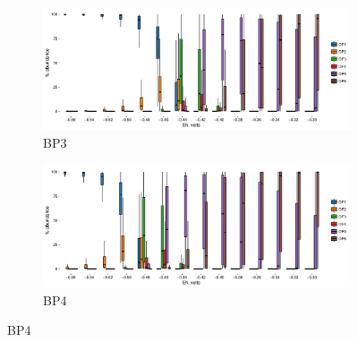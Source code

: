 {\begin{figure}[h]
    \begin{subfigure}[b]{\linewidth}
      	\includegraphics[width=1\linewidth]{"figs_ch2/boxplot_ggplot_02bin Bison OF3 iter 999"}
      	\caption{BP3}
        \label{fig:BP3_mc}
    \end{subfigure}
    \begin{subfigure}[b]{\linewidth}
    	\includegraphics[width=1\linewidth]{"figs_ch2/boxplot_ggplot_02bin Bison OF4 iter 999"}
    	\caption{BP4}
        \label{fig:BP4_mc}
    \end{subfigure}
    
\end{figure}

\newpage

\begin{figure}[h]\ContinuedFloat


\end{figure}}
